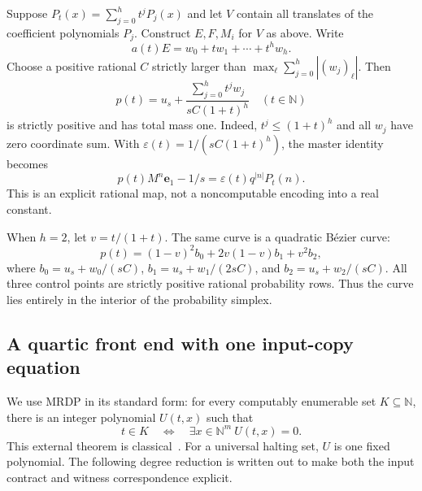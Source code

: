 \documentclass[11pt,letterpaper]{article}
\theoremstyle{definition}
\theoremstyle{remark}
\newcommand{\N}{\mathbb N}
\newcommand{\e}{\mathbf e}
\begin{document}
Suppose $P_t(x)=\sum_{j=0}^{h}t^jP_j(x)$ and let $V$ contain all translates
of the coefficient polynomials $P_j$. Construct $E,F,M_i$ for $V$ as above.
Write
\[
 a(t)E=w_0+tw_1+\cdots+t^h w_h.
\]
Choose a positive rational $C$ strictly larger than
$\max_\ell\sum_{j=0}^{h}|(w_j)_\ell|$. Then
\begin{equation}\label{ste:mx:eq:paramload}
 p(t)=u_s+\frac{\sum_{j=0}^{h}t^j w_j}{sC(1+t)^h}
 \quad(t\in\N)
\end{equation}
is strictly positive and has total mass one. Indeed, $t^j\leq(1+t)^h$ and
all $w_j$ have zero coordinate sum. With
$\varepsilon(t)=1/(sC(1+t)^h)$, the master identity becomes
\begin{equation}\label{ste:mx:eq:paramsignal}
 p(t)M^n\e_1-1/s=\varepsilon(t)q^{|n|}P_t(n).
\end{equation}
This is an explicit rational map, not a noncomputable encoding into a real
constant.

When $h=2$, let $v=t/(1+t)$. The same curve is a quadratic B\'ezier curve:
\begin{equation}\label{ste:mx:eq:bezier}
 p(t)=(1-v)^2b_0+2v(1-v)b_1+v^2b_2,
\end{equation}
where
$b_0=u_s+w_0/(sC)$, $b_1=u_s+w_1/(2sC)$, and
$b_2=u_s+w_2/(sC)$. All three control points are strictly positive rational
probability rows. Thus the curve lies entirely in the interior of the
probability simplex.

\subsection{A quartic front end with one input-copy equation}

We use MRDP in its standard form: for every computably enumerable set
$K\subseteq\N$, there is an integer polynomial $U(t,x)$ such that
\begin{equation}\label{ste:mx:eq:mrdp}
 t\in K\quad\Longleftrightarrow\quad
 \exists x\in\N^m\ U(t,x)=0.
\end{equation}
This external theorem is classical~\cite{davis}. For a universal halting set,
$U$ is one fixed polynomial. The following degree reduction is written out to
make both the input contract and witness correspondence explicit.
\end{document}
